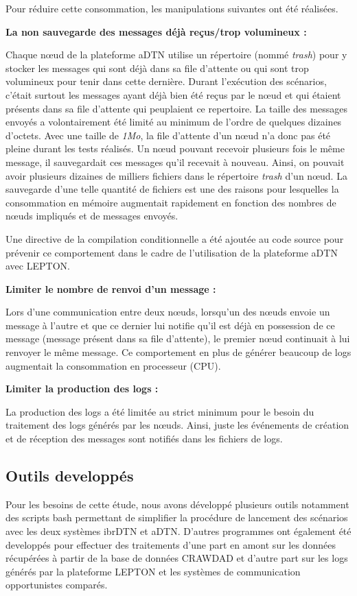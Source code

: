 \documentclass[a4paper,10pt]{article}
\begin{document}
Pour réduire cette consommation, les manipulations suivantes ont été réalisées.\par

\noindent \textbf{La non sauvegarde des messages déjà reçus/trop volumineux :}
 
\noindent Chaque nœud de la plateforme aDTN utilise un répertoire (nommé \emph{trash}) pour y stocker les messages qui sont déjà dans sa file d'attente ou qui sont trop volumineux pour tenir dans cette dernière.
Durant l'exécution des scénarios, c'était surtout les messages ayant déjà bien été reçus par le nœud et qui étaient présents dans sa file d'attente qui peuplaient ce repertoire. La taille des messages envoyés a volontairement été limité au minimum de l'ordre de quelques dizaines d'octets. Avec une taille de \emph{1Mo}, la file d'attente d'un nœud n'a donc pas été pleine durant les tests réalisés. Un nœud pouvant recevoir plusieurs fois le même message, il sauvegardait ces messages qu'il recevait à nouveau. Ainsi, on pouvait avoir plusieurs dizaines de milliers fichiers dans le répertoire \textit{trash} d'un nœud. La sauvegarde d'une telle quantité de fichiers est une des raisons pour lesquelles la consommation en mémoire augmentait rapidement en fonction des nombres de nœuds impliqués et de messages envoyés.

Une directive de la compilation conditionnelle a été ajoutée au code source pour prévenir ce comportement dans le cadre de l'utilisation de la plateforme aDTN avec LEPTON.\par

\noindent \textbf{Limiter le nombre de renvoi d'un message :}
 
\noindent Lors d'une communication entre deux nœuds, lorsqu'un des nœuds envoie un message à l'autre et que ce dernier lui notifie qu'il est déjà en possession de ce message (message présent dans sa file d'attente), le premier nœud continuait à lui renvoyer le même message. Ce comportement en plus de générer beaucoup de logs augmentait la consommation en processeur (CPU).\par

\noindent \textbf{Limiter la production des logs :}

\noindent La production des logs a été limitée au strict minimum pour le besoin du traitement des logs générés par les nœuds. Ainsi, juste les événements de création et de réception des messages sont notifiés dans les fichiers de logs.

\subsection {Outils developpés}
Pour les besoins de cette étude, nous avons développé plusieurs outils notamment des scripts bash permettant de simplifier la procédure de lancement des scénarios avec les deux systèmes ibrDTN et aDTN. D'autres programmes ont également été developpés pour effectuer des traitements d'une part en amont sur les données récupérées à partir de la base de données CRAWDAD et d'autre part sur les logs générés par la plateforme LEPTON et les systèmes de communication opportunistes comparés. \par
\end{document}
